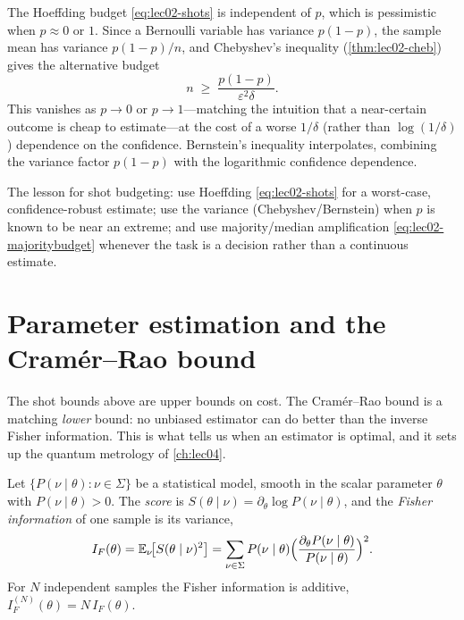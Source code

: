 \begin{example}\label{exa:lec02-cheb-shots}
The Hoeffding budget \eqref{eq:lec02-shots} is independent of $p$, which is
pessimistic when $p\approx0$ or $1$. Since a Bernoulli variable has variance
$p(1-p)$, the sample mean has variance $p(1-p)/n$, and Chebyshev's inequality
(\cref{thm:lec02-cheb}) gives the alternative budget
\[
  n\;\ge\;\frac{p(1-p)}{\varepsilon^{2}\delta}.
\]
This vanishes as $p\to0$ or $p\to1$---matching the intuition that a near-certain
outcome is cheap to estimate---at the cost of a worse $1/\delta$ (rather than
$\log(1/\delta)$) dependence on the confidence. Bernstein's inequality interpolates,
combining the variance factor $p(1-p)$ with the logarithmic confidence dependence.
\end{example}

The lesson for shot budgeting: use Hoeffding \eqref{eq:lec02-shots} for a
worst-case, confidence-robust estimate; use the variance (Chebyshev/Bernstein) when
$p$ is known to be near an extreme; and use majority/median amplification
\eqref{eq:lec02-majoritybudget} whenever the task is a decision rather than a
continuous estimate.

\section{Parameter estimation and the Cram\'er--Rao bound}
\label{sec:lec02-5}

The shot bounds above are upper bounds on cost. The Cram\'er--Rao bound is a
matching \emph{lower} bound: no unbiased estimator can do better than the inverse
Fisher information. This is what tells us when an estimator is optimal, and it sets
up the quantum metrology of \cref{ch:lec04}.

\begin{definition}\label{def:lec02-fisher}
Let $\{P(\nu\mid\theta):\nu\in\Sigma\}$ be a statistical model, smooth in the scalar
parameter $\theta$ with $P(\nu\mid\theta)>0$. The \emph{score} is
$S(\theta\mid\nu)=\partial_\theta\log P(\nu\mid\theta)$, and the
\emph{Fisher information} of one sample is its variance,
\begin{equation}\label{eq:lec02-FI}
  I_F(\theta)=\mathbb{E}_\nu\!\bigl[S(\theta\mid\nu)^{2}\bigr]
   =\sum_{\nu\in\Sigma}P(\nu\mid\theta)\Bigl(\frac{\partial_\theta P(\nu\mid\theta)}{P(\nu\mid\theta)}\Bigr)^{2}.
\end{equation}
For $N$ independent samples the Fisher information is additive,
$I_F^{(N)}(\theta)=N\,I_F(\theta)$.
\end{definition}

